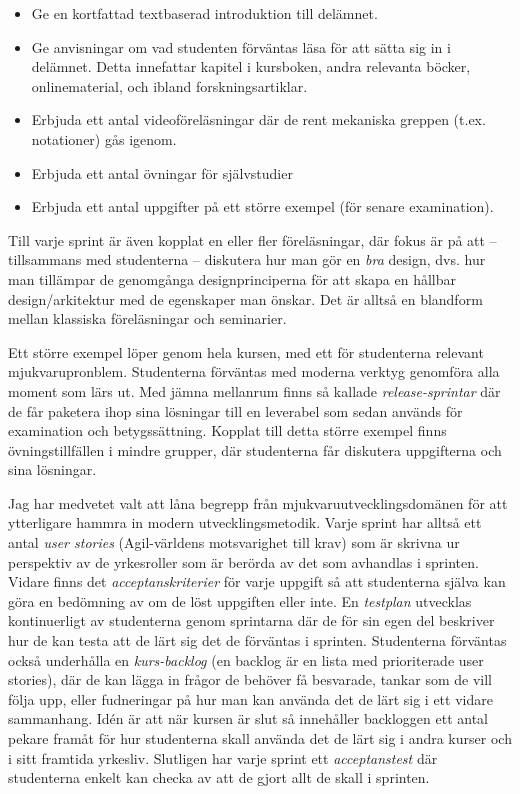 \documentclass[10pt,t,a4paper]{article}
\begin{document}
\begin{itemize}
\item Ge en kortfattad textbaserad introduktion till delämnet.
\item Ge anvisningar om vad studenten förväntas läsa för att sätta sig in i delämnet. Detta innefattar kapitel i kursboken, andra relevanta böcker, onlinematerial, och ibland forskningsartiklar.
\item Erbjuda ett antal videoföreläsningar där de rent mekaniska greppen (t.ex. notationer) gås igenom.
\item Erbjuda ett antal övningar för självstudier
\item Erbjuda ett antal uppgifter på ett större exempel (för senare examination).
\end{itemize}

Till varje sprint är även kopplat en eller fler föreläsningar, där fokus är på att -- tillsammans med studenterna -- diskutera hur man gör en \emph{bra} design, dvs. hur man tillämpar de genomgånga designprinciperna för att skapa en hållbar design/arkitektur med de egenskaper man önskar. Det är alltså en blandform mellan klassiska föreläsningar och seminarier.

Ett större exempel löper genom hela kursen, med ett för studenterna relevant mjukvarupronblem. Studenterna förväntas med moderna verktyg genomföra alla moment som lärs ut. Med jämna mellanrum finns så kallade \emph{release-sprintar} där de får paketera ihop sina lösningar till en leverabel som sedan används för examination och betygssättning. Kopplat till detta större exempel finns övningstillfällen i mindre grupper, där studenterna får diskutera uppgifterna och sina lösningar.

Jag har medvetet valt att låna begrepp från mjukvaruutvecklingsdomänen för att ytterligare hammra in modern utvecklingsmetodik. Varje sprint har alltså ett antal \emph{user stories} (Agil-världens motsvarighet till krav) som är skrivna ur perspektiv av de yrkesroller som är berörda av det som avhandlas i sprinten. Vidare finns det \emph{acceptanskriterier} för varje uppgift så att studenterna själva kan göra en bedömning av om de löst uppgiften eller inte. En \emph{testplan} utvecklas kontinuerligt av studenterna genom sprintarna där de för sin egen del beskriver hur de kan testa att de lärt sig det de förväntas i sprinten. Studenterna förväntas också underhålla en \emph{kurs-backlog} (en backlog är en lista med prioriterade user stories), där de kan lägga in frågor de behöver få besvarade, tankar som de vill följa upp, eller fudneringar på hur man kan använda det de lärt sig i ett vidare sammanhang. Idén är att när kursen är slut så innehåller backloggen ett antal pekare framåt för hur studenterna skall använda det de lärt sig i andra kurser och i sitt framtida yrkesliv. Slutligen har varje sprint ett \emph{acceptanstest} där studenterna enkelt kan checka av att de gjort allt de skall i sprinten.
\end{document}
